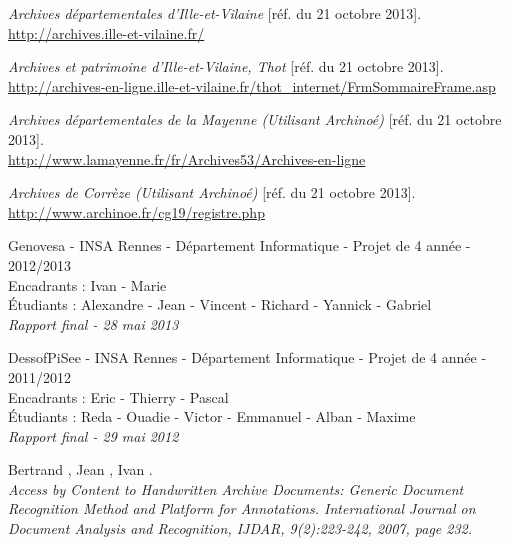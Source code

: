 \documentclass[a4paper]{article}
\begin{document}
\begin{thebibliography}{9}

	\emph{Archives d\'epartementales d'Ille-et-Vilaine} [r\'ef. du 21 octobre 2013]. \\
	\url{http://archives.ille-et-vilaine.fr/}
    
	\emph{Archives et patrimoine d'Ille-et-Vilaine, Thot} [r\'ef. du 21 octobre 2013]. \\
    \url{http://archives-en-ligne.ille-et-vilaine.fr/thot_internet/FrmSommaireFrame.asp}
    
	\emph{Archives d\'epartementales de la Mayenne (Utilisant Archino\'e)}  [r\'ef. du 21 octobre 2013]. \\
    \url{http://www.lamayenne.fr/fr/Archives53/Archives-en-ligne}

	\emph{Archives de Corr\`eze (Utilisant Archino\'e)}  [r\'ef. du 21 octobre 2013]. \\
    \url{http://www.archinoe.fr/cg19/registre.php}
    
	Genovesa - INSA Rennes - D\'epartement Informatique - Projet de 4 ann\'ee - 2012/2013 \\
	Encadrants : Ivan  - Marie  \\
	\'Etudiants : Alexandre  - Jean  - Vincent  - Richard  - Yannick  - Gabriel \\
	\emph{Rapport final - 28 mai 2013}
  
	DessofPiSee - INSA Rennes - D\'epartement Informatique - Projet de 4 ann\'ee - 2011/2012 \\
	Encadrants : Eric  - Thierry  - Pascal  \\
	\'Etudiants : Reda  - Ouadie  - Victor  - Emmanuel  - Alban  - Maxime  \\
	\emph{Rapport final - 29 mai 2012}

    Bertrand , Jean , Ivan .  \\
	\emph{Access by Content to Handwritten Archive Documents: Generic Document Recognition Method and Platform for Annotations. International Journal on Document Analysis and Recognition, IJDAR, 9(2):223-242, 2007, page 232.}
    
\end{thebibliography}
\end{document}
